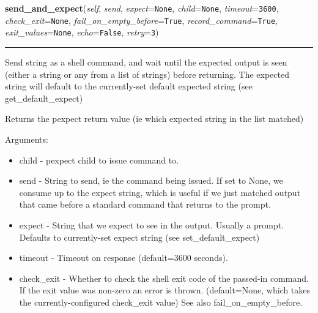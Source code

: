 \hspace{.8\funcindent}\begin{boxedminipage}{\funcwidth}

    \raggedright \textbf{send\_and\_expect}(\textit{self}, \textit{send}, \textit{expect}={\tt None}, \textit{child}={\tt None}, \textit{timeout}={\tt 3600}, \textit{check\_exit}={\tt None}, \textit{fail\_on\_empty\_before}={\tt True}, \textit{record\_command}={\tt True}, \textit{exit\_values}={\tt None}, \textit{echo}={\tt False}, \textit{retry}={\tt 3})

    \vspace{-1.5ex}

    \rule{\textwidth}{0.5\fboxrule}
\setlength{\parskip}{2ex}
    Send string as a shell command, and wait until the expected output is 
    seen (either a string or any from a list of strings) before returning. 
    The expected string will default to the currently-set default expected 
    string (see get\_default\_expect)

    Returns the pexpect return value (ie which expected string in the list 
    matched)

    Arguments:

    \begin{itemize}
    \setlength{\parskip}{0.6ex}
      \item child                      - pexpect child to issue command to.

      \item send                       - String to send, ie the command being 
        issued. If set to None, we consume up to the expect string, which 
        is useful if we just matched output that came before a standard 
        command that returns to the prompt.

      \item expect                     - String that we expect to see in the 
        output. Usually a prompt. Defaults to currently-set expect string 
        (see set\_default\_expect)

      \item timeout                    - Timeout on response (default=3600 
        seconds).

      \item check\_exit                 - Whether to check the shell exit code 
        of the passed-in command.  If the exit value was non-zero an error 
        is thrown. (default=None, which takes the currently-configured 
        check\_exit value) See also fail\_on\_empty\_before.


\end{itemize}
\end{boxedminipage}
